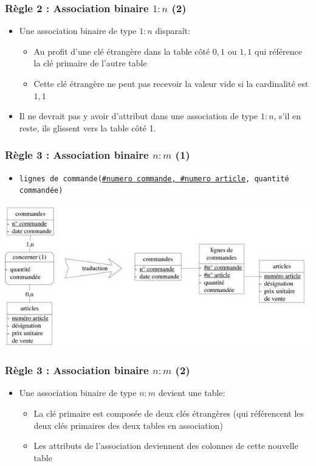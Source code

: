 \begin{frame}
  \frametitle{Règle 2 : Association binaire $1:n$ (2)}
  \begin{itemize}
    \item Une association binaire de type $1 : n$ disparaît:
      \begin{itemize}
        \item Au profit d'une clé étrangère dans la table côté $0,1$ ou $1,1$ qui référence la clé primaire de l'autre table
        \item Cette clé étrangère ne peut pas recevoir la valeur vide si la cardinalité est $1,1$
      \end{itemize}
    \item Il ne devrait pas y avoir d'attribut dans une association de type $1 : n$, s'il en reste, ils
      glissent vers la table côté 1.
  \end{itemize}
\end{frame}

\begin{frame}
  \frametitle{Règle 3 : Association binaire $n:m$ (1)}
  \begin{itemize}
    \item \texttt{lignes de commande(\underline{\#numero commande, \#numero article}, quantité commandée)}
  \end{itemize}
  \begin{center}
    \includegraphics[width=0.9\linewidth]{traduction_nm.jpg}
  \end{center}
\end{frame}

\begin{frame}
  \frametitle{Règle 3 : Association binaire $n:m$ (2)}
  \begin{itemize}
    \item Une association binaire de type $n : m$ devient une table:
      \begin{itemize}
        \item La clé primaire est composée de deux clés étrangères (qui référencent les deux clés primaires
          des deux tables en association)
        \item Les attributs de l'association deviennent des colonnes de cette nouvelle table
      \end{itemize}
  \end{itemize}
\end{frame}

